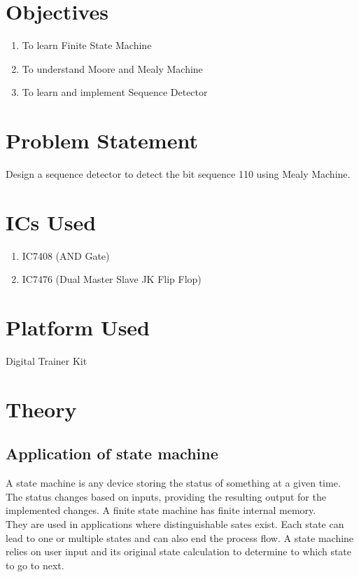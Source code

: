 \documentclass[11pt]{article}
\begin{document}
\tableofcontents
\thispagestyle{empty}
\clearpage


\setcounter{page}{1}
\section{Objectives}
\begin{enumerate}
	\item To learn Finite State Machine
	\item To understand Moore and Mealy Machine
	\item To learn and implement Sequence Detector
	
	
\end{enumerate}

\section{Problem Statement}
Design a sequence detector to detect the bit sequence 110 using Mealy Machine.


\section{ICs Used}

\begin{enumerate}
	\item IC7408 (AND Gate)
	\item IC7476 (Dual Master Slave JK Flip Flop)
\end{enumerate}

\section{Platform Used}
Digital Trainer Kit

\section{Theory}
\subsection{Application of state machine}

A state machine is any device storing the status of something at a given time. The status changes based on inputs, providing the resulting output for the implemented changes. A finite state machine has finite internal memory.\\

They are used in applications where distinguishable sates exist. Each state can lead to one or multiple states and can also end the process flow. A state machine relies on user input and its original state calculation to determine to which state to go to next. 
\end{document}
